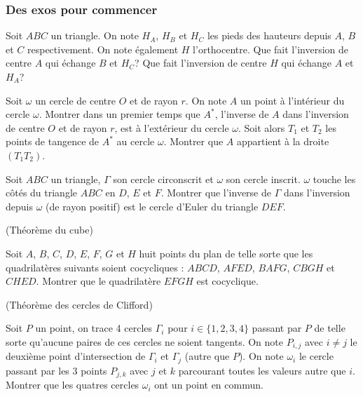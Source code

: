 \subsubsection{Des exos pour commencer}

\begin{exo}

Soit $ABC$ un triangle. On note $H_A$, $H_B$ et $H_C$ les pieds des hauteurs depuis $A$, $B$ et $C$ respectivement. On note également $H$ l'orthocentre. Que fait l'inversion de centre $A$ qui échange $B$ et $H_C$? Que fait l'inversion de centre $H$ qui échange $A$ et $H_A$?
\end{exo}

\begin{exo}

Soit $\omega$ un cercle de centre $O$ et de rayon $r$. On note $A$ un point à l'intérieur du cercle $\omega$. Montrer dans un premier temps que $A^*$, l'inverse de $A$ dans l'inversion de centre $O$ et de rayon $r$, est à l'extérieur du cercle $\omega$. Soit alors $T_1$ et $T_2$ les points de tangence de $A^*$ au cercle $\omega$. Montrer que $A$ appartient à la droite $(T_1T_2)$.
\end{exo}

\begin{exo}

Soit $ABC$ un triangle, $\Gamma$ son cercle circonscrit et $\omega$ son cercle inscrit. $\omega$ touche les côtés du triangle $ABC$ en $D$, $E$ et $F$. Montrer que l'inverse de $\Gamma$ dans l'inversion depuis $\omega$ (de rayon positif) est le cercle d'Euler du triangle $DEF$.
\end{exo}

\begin{exo}(Théorème du cube)

Soit $A$, $B$, $C$, $D$, $E$, $F$, $G$ et $H$ huit points du plan de telle sorte que les quadrilatères suivants soient cocycliques : $ABCD$, $AFED$, $BAFG$, $CBGH$ et $CHED$. Montrer que le quadrilatère $EFGH$ est cocyclique.
\end{exo}

\begin{exo}(Théorème des cercles de Clifford)

Soit $P$ un point, on trace 4 cercles $\Gamma_i$ pour $i \in \{1,2, 3, 4\}$ passant par $P$ de telle sorte qu'aucune paires de ces cercles ne soient tangents. On note $P_{i,j}$ avec $i\neq j$ le deuxième point d'intersection de $\Gamma_i$ et $\Gamma_j$ (autre que $P$). On note $\omega_i$ le cercle passant par les 3 points $P_{j,k}$ avec $j$ et $k$ parcourant toutes les valeurs autre que $i$. Montrer que les quatres cercles $\omega_i$ ont un point en commun.
\end{exo}

